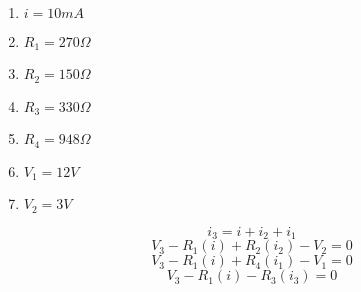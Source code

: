 \begin{minipage}[c]{10em}{
\begin{enumerate}[]
    \item $i=10 mA$
    \item $R_1=270 \Omega$
    \item $R_2=150 \Omega$
    \item $R_3=330 \Omega$
    \item $R_4=948 \Omega$
    \item $V_1=12 V$
    \item $V_2=3 V$
\end{enumerate}}
\end{minipage}
\hspace{5em}
\begin{minipage}[c]{20em}
\begin{equation}
i_3=i+i_2+i_1
\end{equation}
\begin{equation}
V_3-R_{1}(i)+R_{2}(i_{2})-V_2 = 0
\end{equation}
\begin{equation}
V_3-R_{1}(i)+R_{4}(i_{1})-V_1 = 0
\end{equation}
\begin{equation}
V_3-R_{1}(i)-R_{3}(i_{3}) = 0
\end{equation}
\end{minipage}

